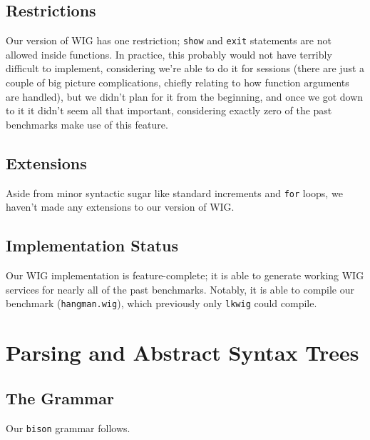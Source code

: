 \documentclass{WigReport}
\begin{document}
\subsection{Restrictions}
Our version of WIG has one restriction; {\tt show} and {\tt exit}
statements are not allowed inside functions. In practice, this probably
would not have terribly difficult to implement, considering we're able to
do it for sessions (there are just a couple of big picture complications,
chiefly relating to how function arguments are handled), but we didn't
plan for it from the beginning, and once we got down to it it didn't seem
all that important, considering exactly zero of the past benchmarks make
use of this feature.

\subsection{Extensions}
Aside from minor syntactic sugar like standard increments and {\tt for}
loops, we haven't made any extensions to our version of WIG.

\subsection{Implementation Status}
Our WIG implementation is feature-complete; it is able to generate working
WIG services for nearly all of the past benchmarks. Notably, it is able
to compile our benchmark ({\tt hangman.wig}), which previously only
{\tt lkwig} could compile.

\clearpage

\section{Parsing and Abstract Syntax Trees}
\subsection{The Grammar}

Our {\tt bison} grammar follows.
\end{document}
